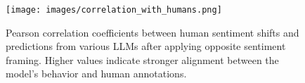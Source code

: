 \begin{figure}[b!]
    \centering
    \texttt{[image: images/correlation\_with\_humans.png]}
    \caption{Pearson correlation coefficients between human sentiment shifts and predictions from various LLMs after applying opposite sentiment framing. Higher values indicate stronger alignment between the model's behavior and human annotations.}
    \label{fig:correlation-to-humans}
\end{figure}